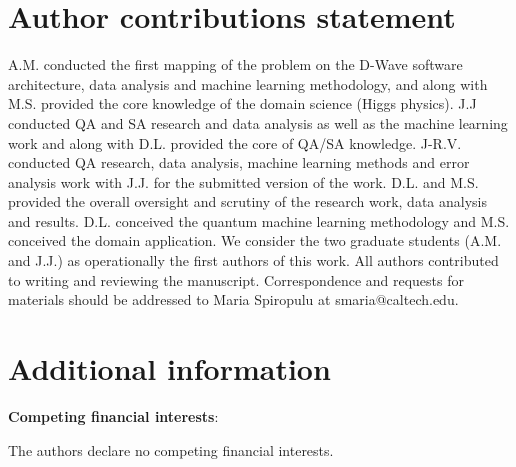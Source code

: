 \documentclass[fleqn,10pt]{wlscirep}
\begin{document}
%

\section*{Author contributions statement}
A.M. conducted  the first mapping of the problem on the D-Wave software architecture, data analysis and machine learning methodology,  and along with M.S. provided the core knowledge of the domain science (Higgs physics). J.J conducted  QA and SA  research and data analysis as well as the machine learning work and along with D.L. provided the core of QA/SA knowledge. J-R.V. conducted  QA research, data analysis, machine learning methods and error analysis work with J.J. for the submitted version of the work.  D.L. and M.S. provided the overall oversight and scrutiny of the research work, data analysis and results.  D.L. conceived the quantum machine learning methodology and M.S. conceived the domain application.   We consider the two graduate students (A.M. and J.J.) as operationally the first authors of this work. All authors contributed to writing and reviewing the manuscript. Correspondence and requests for materials should be addressed to Maria Spiropulu at smaria@caltech.edu.
%

\section*{Additional information}
%
\textbf{Competing financial interests}:

The authors declare no competing financial interests.


\FloatBarrier
\newpage\newpage
\end{document}
